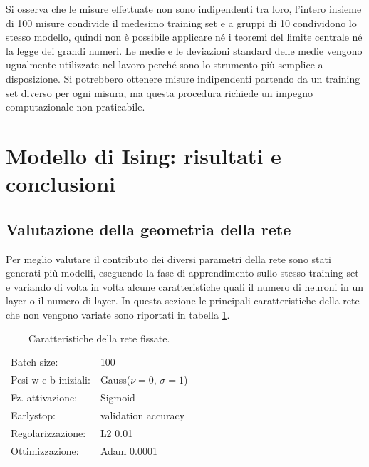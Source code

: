 \documentclass{article}
\begin{document}
Si osserva che le misure effettuate non sono indipendenti tra loro, l'intero insieme di 100 misure condivide il medesimo training set e a gruppi di 10 condividono lo stesso modello, quindi non è possibile applicare né i teoremi del limite centrale né la legge dei grandi numeri.
Le medie e le deviazioni standard delle medie vengono ugualmente utilizzate nel lavoro perché sono lo strumento più semplice a disposizione.
Si potrebbero ottenere misure indipendenti partendo da un training set diverso per ogni misura, ma questa procedura richiede un impegno computazionale non praticabile.


\section{Modello di Ising: risultati e conclusioni}

\subsection{Valutazione della geometria della rete}
Per meglio valutare il contributo dei diversi parametri della rete sono stati generati più modelli, eseguendo la fase di apprendimento sullo stesso training set e variando di volta in volta alcune caratteristiche quali il numero di neuroni in un layer o il numero di layer.
In questa sezione le principali caratteristiche  della rete che non vengono variate sono riportati in tabella \ref{tab:ffnnfixed}.

\begin{table}[ht]
\begin{center}
\begin{tabular}{ll}
\toprule
Batch size: & 100\\
Pesi w e b iniziali: & Gauss($\nu=0$, $\sigma=1$)\\
Fz. attivazione: & Sigmoid\\
Earlystop: & validation accuracy \\
Regolarizzazione: & L2 0.01\\
Ottimizzazione: & Adam 0.0001 \\
\bottomrule
\end{tabular}
\end{center}
\caption{Caratteristiche della rete fissate.}
\label{tab:ffnnfixed}
\end{table}
\end{document}
